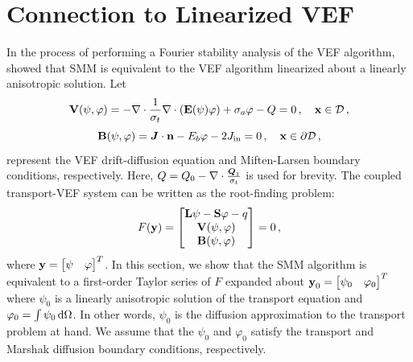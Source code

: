 \documentclass[../doc.tex]{subfiles}
\begin{document}
\section{Connection to Linearized VEF} \label{smm_sec:linearize}
In the process of performing a Fourier stability analysis of the VEF algorithm, \textcite{cefus} showed that SMM is equivalent to the VEF algorithm linearized about a linearly anisotropic solution. Let 
	\begin{equation}
		\boldsymbol{\mathrm{V}}(\psi,\varphi) = -\nabla\cdot\frac{1}{\sigma_t}\nabla\cdot\left( \boldsymbol{\mathrm{E}}(\psi)\varphi \right) + \sigma_a \varphi - Q = 0 \,, \quad \boldsymbol{\mathrm{x}} \in \mathcal{D} \,,
	\end{equation}
	\begin{equation}
		\boldsymbol{\mathrm{B}}(\psi,\varphi) = \boldsymbol{J}\cdot\boldsymbol{\mathrm{n}} - E_b \varphi - 2J_\text{in} = 0 \,, \quad \boldsymbol{\mathrm{x}} \in \partial\mathcal{D} \,,
	\end{equation}
represent the VEF drift-diffusion equation and Miften-Larsen boundary conditions, respectively. Here, $Q = Q_0 - \nabla\cdot\frac{\boldsymbol{Q}_1}{\sigma_t}$ is used for brevity. The coupled transport-VEF system can be written as the root-finding problem: 
	\begin{equation} \label{smm:vef_root}
		F(\boldsymbol{\mathrm{y}}) = \begin{bmatrix} 
			\boldsymbol{\mathrm{L}}\psi - \boldsymbol{\mathrm{S}}\varphi - q \\ 
			\boldsymbol{\mathrm{V}}(\psi,\varphi) \\ 
			\boldsymbol{\mathrm{B}}(\psi,\varphi)
		\end{bmatrix}
		= 0 \,, 
	\end{equation}
where $\boldsymbol{\mathrm{y}} = \begin{bmatrix} \psi & \varphi \end{bmatrix}^T$. In this section, we show that the SMM algorithm is equivalent to a first-order Taylor series of $F$ expanded about $\boldsymbol{\mathrm{y}}_0 = \begin{bmatrix} \psi_0 & \varphi_0 \end{bmatrix}^T$ where $\psi_0$ is a linearly anisotropic solution of the transport equation and $\varphi_0 = \int \psi_0 \mathop{}\!\mathrm{d} \Omega$. In other words, $\psi_0$ is the diffusion approximation to the transport problem at hand. We assume that the $\psi_0$ and $\varphi_0$ satisfy the transport and Marshak diffusion boundary conditions, respectively. 
\end{document}
